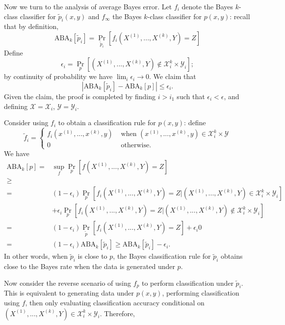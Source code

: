 Now we turn to the analysis of average Bayes error.
Let $f_i$ denote the Bayes $k$-class classifier for $\tilde{p}_i(x, y)$
and
$f_\infty$ the Bayes $k$-class classifier for $p(x, y)$: recall that by definition,
\[
\text{ABA}_k[\tilde{p}_i] = \Pr_{\tilde{p}_i}[f_i(X^{(1)},...,X^{(k)}, Y) = Z]
\]
Define
\[
\epsilon_i = \Pr_p[(X^{(1)},...,X^{(k)}, Y)\notin \mathcal{X}_i^k \times \mathcal{Y}_i];
\]
by continuity of probability we have $\lim_i \epsilon_i \to 0$.
We claim that
\[
|\text{ABA}_k[\tilde{p}_i] - \text{ABA}_k[p]| \leq \epsilon_i.
\]
Given the claim, the proof is completed by finding $i > i_1$ such that $\epsilon_i < \epsilon$,
and defining $\mathcal{X} = \mathcal{X}_i$, $\mathcal{Y} = \mathcal{Y}_i$.

Consider using $f_i$ to obtain a classification rule for $p(x, y)$:
define
\[
\tilde{f}_i = \begin{cases}f_i(x^{(1)},...,x^{(k)}, y) & \text{ when } (x^{(1)},...,x^{(k)}, y) \in \mathcal{X}_i^k \times \mathcal{Y}\\
0 & \text{ otherwise.} 
\end{cases}
\]
We have
\begin{align*}
\text{ABA}_k[p] =& \sup_f \Pr_p[f(X^{(1)},...,X^{(k)}, Y) = Z]
\\ \geq& 
\\=& (1-\epsilon_i)\Pr_p[f_i(X^{(1)},...,X^{(k)}, Y) = Z|(X^{(1)},...,X^{(k)}, Y)\in \mathcal{X}_i^k \times \mathcal{Y}_i]
\\&+ \epsilon_i \Pr_p[f_i(X^{(1)},...,X^{(k)}, Y) = Z|(X^{(1)},...,X^{(k)}, Y)\notin \mathcal{X}_i^k \times \mathcal{Y}_i]
\\=& (1-\epsilon_i)\Pr_{\tilde{p}}[f_i(X^{(1)},...,X^{(k)}, Y) = Z]
+ \epsilon_i 0
\\=& (1-\epsilon_i) \text{ABA}_k[\tilde{p}_i] \geq \text{ABA}_k[\tilde{p}_i] - \epsilon_i.
\end{align*}
In other words, when $\tilde{p}_i$ is close to $p$, the Bayes
classification rule for $\tilde{p}_i$ obtains close to the Bayes rate
when the data is generated under $p$.

Now consider the reverse scenario of using $f_p$ to perform
classification under $\tilde{p}_i$.  This is equivalent to generating
data under $p(x, y)$, performing classification using $f$, then only
evaluating classification accuracy conditional on $(X^{(1)},...,X^{(k)},
Y)\in \mathcal{X}_i^k \times \mathcal{Y}_i$.  Therefore,

